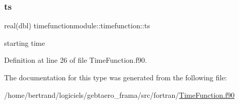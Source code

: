 \subsubsection{\texorpdfstring{ts}{ts}}
{\footnotesize\ttfamily real(dbl) timefunctionmodule\+::timefunction\+::ts\hspace{0.3cm}{\ttfamily [private]}}



starting time 



Definition at line 26 of file Time\+Function.\+f90.



The documentation for this type was generated from the following file\+:\begin{DoxyCompactItemize}
\item 
/home/bertrand/logiciels/gebtaero\+\_\+frama/src/fortran/\hyperlink{_time_function_8f90}{Time\+Function.\+f90}\end{DoxyCompactItemize}
